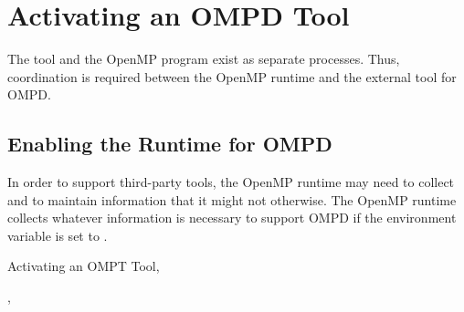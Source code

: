 \section{Activating an OMPD Tool}
\label{subsec:activating}

The tool and the OpenMP program exist as separate processes. 
Thus, coordination is required between the OpenMP runtime
and the external tool for OMPD.

\subsection{Enabling the Runtime for OMPD}
\label{subsubsec:enabling-ompd}

In order to support third-party tools, the OpenMP runtime may need to collect
and to maintain information that it might not otherwise. The OpenMP runtime 
collects whatever information is necessary to support OMPD if the environment 
variable  is set to .

\begin{crossrefs}
\item Activating an OMPT Tool, 

\item   {}, 
\end{crossrefs}




